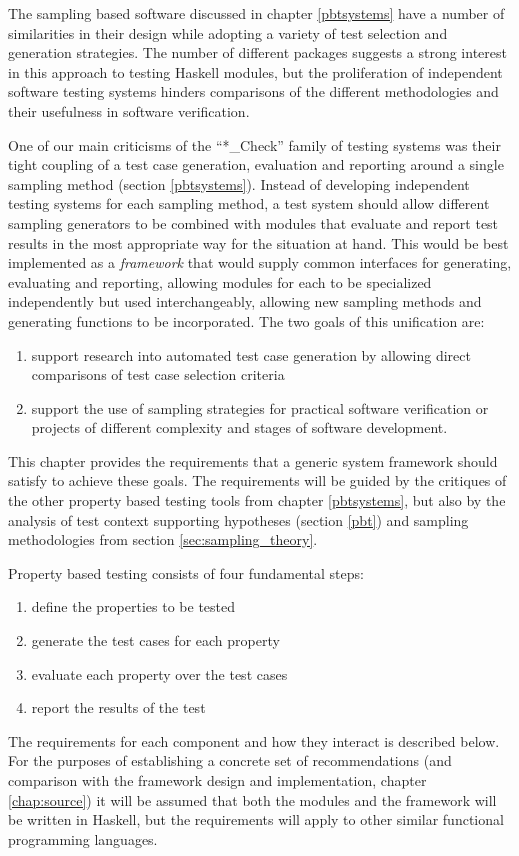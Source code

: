 The sampling based \pbt software discussed in chapter \ref{pbtsystems}
have a number of similarities in their design
while adopting a variety of test selection and generation strategies.
The number of different packages suggests 
a strong interest in this approach to testing Haskell modules,
but the proliferation of independent software testing systems 
hinders comparisons of the different methodologies and their usefulness in software verification.

One of our main criticisms of the ``*\_Check'' family of testing systems
was their tight coupling of a test case generation, evaluation and reporting
around a single sampling method (section \ref{pbtsystems}).
Instead of developing independent testing systems for each sampling method,
a test system should allow different sampling generators to be combined with
modules that evaluate and report test results in the most appropriate way for the situation at hand.
This would be best implemented as a \emph{framework} that
would supply common interfaces for generating, evaluating and reporting,
allowing modules for each to be specialized independently but used interchangeably,
allowing new sampling methods and generating functions to be incorporated.
The two goals of this unification are:
\begin{enumerate}
\item support research into automated test case generation
by allowing direct comparisons of test case selection criteria
\item support the use of sampling strategies for practical software verification 
or projects of different complexity and stages of software development.
\end{enumerate}
\noindent This chapter provides the requirements that a generic \pbt system framework should satisfy
to achieve these goals.
The requirements will be guided by the critiques of the other property based testing tools from chapter \ref{pbtsystems},
but also by the analysis of test context supporting hypotheses (section \ref{pbt}) and 
sampling methodologies from section \ref{sec:sampling_theory}.

Property based testing consists of four fundamental steps:
\begin{enumerate}
\item define the properties to be tested
\item generate the test cases for each property
\item evaluate each property over the test cases
\item report the results of the test
\end{enumerate}
\noindent
The requirements for each component and how they interact is described below.
For the purposes of establishing a concrete set of recommendations
(and comparison with the \GC framework design and implementation, chapter \ref{chap:source})
it will be assumed that both the modules and
the framework will be written in Haskell,
but the requirements will apply to other similar functional programming languages.

